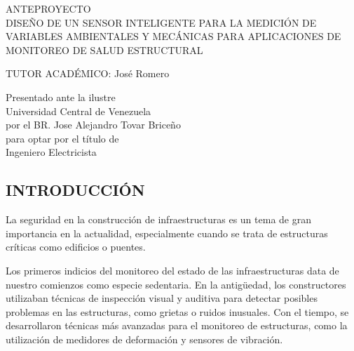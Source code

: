 \documentclass[12pt,letterpaper]{article}
\author{} %
\date{FECHA} %
\begin{document}
	
	\renewcommand{\listfigurename}{Lista de Figuras}
	\renewcommand{\listtablename}{Lista de Tablas}
	\renewcommand{\contentsname}{Lista de Contenidos}
	\renewcommand{\figurename}{Figura}
	\renewcommand{\tablename}{Tabla}

	
\begin{center}

\vspace{3cm} ANTEPROYECTO \\

\vspace{8cm} DISEÑO DE UN SENSOR INTELIGENTE PARA LA MEDICIÓN DE VARIABLES AMBIENTALES Y MECÁNICAS PARA APLICACIONES DE MONITOREO DE SALUD ESTRUCTURAL
\end{center}


\vspace{6cm}

\begin{flushleft}
	TUTOR ACADÉMICO: José Romero \\
\end{flushleft}

	
\begin{flushright}
	
		Presentado ante la ilustre\\
		Universidad Central de Venezuela\\
		por el BR. Jose Alejandro Tovar Briceño \\
		para optar por el título de \\
		Ingeniero Electricista   \\
	
\end{flushright}


\vspace{2cm}
\thispagestyle{empty}
\newpage


\begin{center}
	\section*{ INTRODUCCIÓN}
\end{center}

La seguridad en la construcción de infraestructuras es un tema de gran importancia en la actualidad, especialmente cuando se trata de estructuras críticas como edificios o puentes. 

Los primeros indicios del monitoreo del estado de las infraestructuras data de nuestro comienzos como especie sedentaria.  En la antigüedad, los constructores utilizaban técnicas de inspección visual y auditiva para detectar posibles problemas en las estructuras, como grietas o ruidos inusuales. Con el tiempo, se desarrollaron técnicas más avanzadas para el monitoreo de estructuras, como la utilización de medidores de deformación y sensores de vibración.
\end{document}
